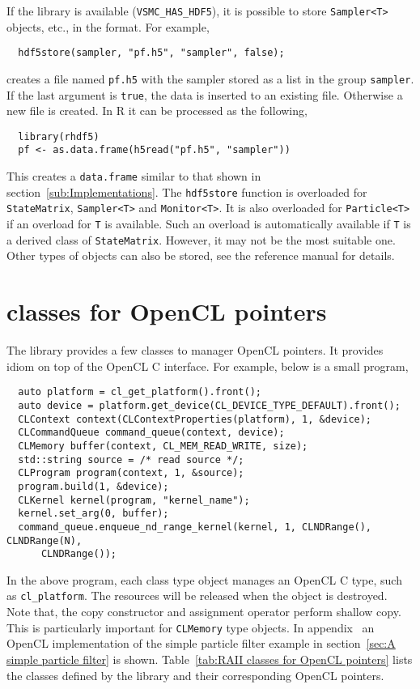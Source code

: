 If the \hdf library is available (\verb|VSMC_HAS_HDF5|), it is possible to
store \verb|Sampler<T>| objects, etc., in the \hdf format. For example,
\begin{Verbatim}
  hdf5store(sampler, "pf.h5", "sampler", false);
\end{Verbatim}
creates a \hdf file named \verb|pf.h5| with the sampler stored as a list in the
group \verb|sampler|. If the last argument is \verb|true|, the data is inserted
to an existing file. Otherwise a new file is created. In R it can be processed
as the following,
\begin{Verbatim}
  library(rhdf5)
  pf <- as.data.frame(h5read("pf.h5", "sampler"))
\end{Verbatim}
This creates a \verb|data.frame| similar to that shown in
section~\ref{sub:Implementations}. The \verb|hdf5store| function is overloaded
for \verb|StateMatrix|, \verb|Sampler<T>| and \verb|Monitor<T>|. It is also
overloaded for \verb|Particle<T>| if an overload for \verb|T| is available.
Such an overload is automatically available if \verb|T| is a derived class of
\verb|StateMatrix|. However, it may not be the most suitable one. Other types
of objects can also be stored, see the reference manual for details.

\section{\protect\raii classes for OpenCL pointers}
\label{sec:RAII classes for OpenCL pointers}

The library provides a few classes to manager OpenCL pointers. It provides
\raii idiom on top of the OpenCL C interface. For example, below is a small
program,
\begin{Verbatim}
  auto platform = cl_get_platform().front();
  auto device = platform.get_device(CL_DEVICE_TYPE_DEFAULT).front();
  CLContext context(CLContextProperties(platform), 1, &device);
  CLCommandQueue command_queue(context, device);
  CLMemory buffer(context, CL_MEM_READ_WRITE, size);
  std::string source = /* read source */;
  CLProgram program(context, 1, &source);
  program.build(1, &device);
  CLKernel kernel(program, "kernel_name");
  kernel.set_arg(0, buffer);
  command_queue.enqueue_nd_range_kernel(kernel, 1, CLNDRange(), CLNDRange(N),
      CLNDRange());
\end{Verbatim}
In the above program, each class type object manages an OpenCL C type, such as
\verb|cl_platform|. The resources will be released when the object is
destroyed. Note that, the copy constructor and assignment operator perform
shallow copy. This is particularly important for \verb|CLMemory| type objects.
In appendix~ an OpenCL
implementation of the simple particle filter example in section~\ref{sec:A
  simple particle filter} is shown. Table~\ref{tab:RAII classes for OpenCL
  pointers} lists the classes defined by the library and their corresponding
OpenCL pointers.

